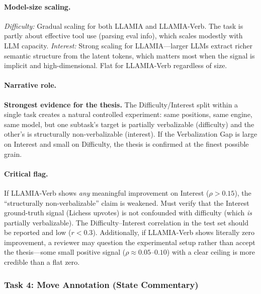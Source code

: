 \paragraph{Model-size scaling.}
\textit{Difficulty:} Gradual scaling for both LLAMIA and LLAMIA-Verb.
The task is partly about effective tool use (parsing eval info),
which scales modestly with LLM capacity.
\textit{Interest:} Strong scaling for LLAMIA---larger LLMs extract
richer semantic structure from the latent tokens, which matters most
when the signal is implicit and high-dimensional. Flat for
LLAMIA-Verb regardless of size.

\paragraph{Narrative role.}
\textbf{Strongest evidence for the thesis.} The
Difficulty/Interest split within a single task creates a natural
controlled experiment: same positions, same engine, same model, but
one subtask's target is partially verbalizable (difficulty) and the
other's is structurally non-verbalizable (interest). If the
Verbalization Gap is large on Interest and small on Difficulty, the
thesis is confirmed at the finest possible grain.

\paragraph{Critical flag.}
If LLAMIA-Verb shows \emph{any} meaningful improvement on Interest
($\rho > 0.15$), the ``structurally non-verbalizable'' claim is
weakened. Must verify that the Interest ground-truth signal
(Lichess upvotes) is not confounded with difficulty (which \emph{is}
partially verbalizable). The Difficulty--Interest correlation in the
test set should be reported and low ($r < 0.3$). Additionally, if
LLAMIA-Verb shows literally zero improvement, a reviewer may
question the experimental setup rather than accept the thesis---some
small positive signal ($\rho \approx 0.05$--$0.10$) with a clear
ceiling is more credible than a flat zero.

\subsubsection*{Task 4: Move Annotation (State Commentary)}
\label{sec:perf_annotation}

